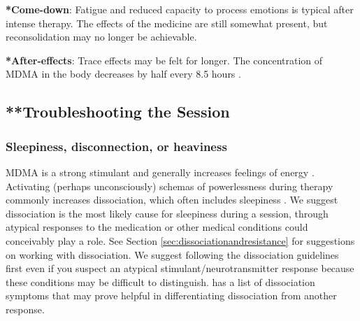 \documentclass[12pt,letterpaper]{book}
\begin{document}
\textbf{*Come-down}: 
Fatigue and reduced capacity to process emotions is typical after intense therapy. The effects of the medicine are still somewhat present, but reconsolidation may no longer be achievable.

\textbf{*After-effects}:
Trace effects may be felt for longer. The concentration of MDMA in the body decreases by half every 8.5 hours \cite{torrePharmacology}.

\subsection{**Troubleshooting the Session}
\label{sec:troubleshooting}
\subsubsection{Sleepiness, disconnection, or heaviness}
MDMA is a strong stimulant and generally increases feelings of energy \cite{vizeliActuteEffects}. Activating (perhaps unconsciously) schemas of powerlessness during therapy commonly increases dissociation, which often includes sleepiness \cite{kozlowskaDefenseCascade}. We suggest dissociation is the most likely cause for sleepiness during a session, through atypical responses to the medication or other medical conditions could conceivably play a role. See Section \ref{sec:dissociationandresistance} for suggestions on working with dissociation. We suggest following the dissociation guidelines first even if you suspect an atypical stimulant/neurotransmitter response because these conditions may be difficult to distinguish. \textcite{cheetahSigns} has a list of dissociation symptoms that may prove helpful in differentiating dissociation from another response.
\end{document}
